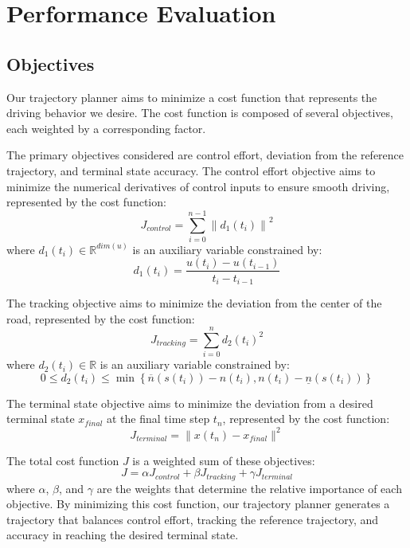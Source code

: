\section{Performance Evaluation} \label{sec:performance-evaluation}

\subsection{Objectives} \label{subsec:objectives}

Our trajectory planner aims to minimize a cost function that represents the driving behavior we desire.
The cost function is composed of several objectives, each weighted by a corresponding factor.

The primary objectives considered are control effort, deviation from the reference trajectory, and terminal state accuracy.
The control effort objective aims to minimize
the numerical derivatives of control inputs to ensure smooth driving, represented by the cost function:
\begin{equation}
	J_{control} = \sum_{i=0}^{n-1} \left\| d_1(t_i) \right\|^2
\end{equation}
where $d_1(t_i)\in \mathbb{R}^{dim(u)}$ is an auxiliary variable constrained by: \[
	d_1(t_i) = \frac{u(t_i) - u(t_{i-1})}{t_i - t_{i-1}}
\]

The tracking objective aims to minimize the deviation from the center of the road, represented by the cost function:
\begin{equation}
	J_{tracking} = \sum_{i=0}^{n} d_2(t_i)^2
\end{equation}
where $d_2(t_i)\in \mathbb{R}$ is an auxiliary variable constrained by: \[
	0 \leq d_2(t_i) \leq \min \left\{ \overline{n}(s(t_i)) - n(t_i), n(t_i) - \underline{n}(s(t_i)) \right\}
\]

The terminal state objective aims to minimize the deviation from a desired terminal state $x_{final}$ at the final time step $t_n$, represented by the cost function:
\begin{equation}
	J_{terminal} = \|x(t_n) - x_{final}\|^2
\end{equation}

The total cost function $J$ is a weighted sum of these objectives:
\begin{equation}
	J = \alpha J_{control} + \beta J_{tracking} + \gamma J_{terminal} \end{equation} where $\alpha$, $\beta$, and $\gamma$ are the weights that determine
the relative importance of each objective.
By minimizing this cost function, our trajectory planner generates a trajectory that balances control effort, tracking the reference trajectory, and
accuracy in reaching the desired terminal state.

